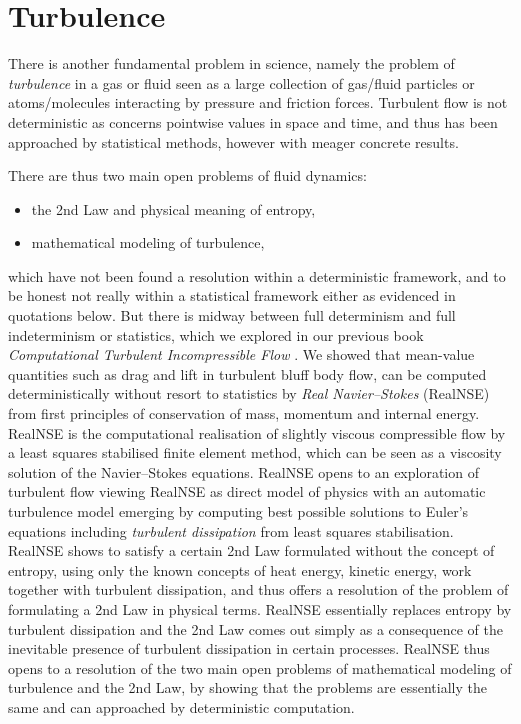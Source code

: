  \section{Turbulence}

There is another fundamental problem in science, namely the problem of \emph{turbulence} in a gas or fluid seen as a large collection of gas/fluid particles or atoms/molecules interacting by pressure and friction forces. Turbulent flow is not deterministic as concerns pointwise values in space and time, and thus has been approached by statistical methods, however with meager concrete results.

There are thus two main open problems of fluid dynamics:
\begin{itemize}
\item the 2nd Law and physical meaning of entropy,
\item mathematical modeling of turbulence, 
\end{itemize}
which have not been found a resolution within a deterministic framework, and to be honest not really within a statistical framework either as evidenced in quotations below. 
\newline
\indent
But there is midway between full determinism and full indeterminism or statistics, which we explored in 
our previous book \emph{Computational Turbulent Incompressible Flow} \cite{ambsflow}. We showed that mean-value quantities such as drag and lift in turbulent bluff body flow, can be computed deterministically without resort to statistics by \emph{Real Navier--Stokes} (RealNSE) from first principles of conservation of mass, momentum and
internal energy. RealNSE is the computational realisation of slightly viscous compressible flow by a least squares stabilised finite element method, which can be seen as a viscosity solution of the Navier--Stokes equations.
\newline
\indent
RealNSE opens to an exploration of turbulent flow viewing RealNSE as direct model of physics with an automatic turbulence model emerging by computing best possible 
solutions to Euler's equations including \emph{turbulent dissipation} from least squares stabilisation. 
RealNSE shows to satisfy a certain 2nd Law formulated without the concept of entropy, using only the known concepts of heat energy, kinetic energy, work together with turbulent dissipation, and thus offers a resolution of the problem of formulating a 2nd Law in physical terms. 
\newline
\indent
RealNSE essentially replaces entropy by turbulent dissipation and the 2nd Law comes out simply as a consequence of the inevitable presence of turbulent dissipation in certain processes.
\newline
\indent
RealNSE thus opens to a resolution of the two main open problems of mathematical modeling of turbulence and the 2nd Law,
by showing that the problems are essentially the same and can approached by deterministic computation. 

